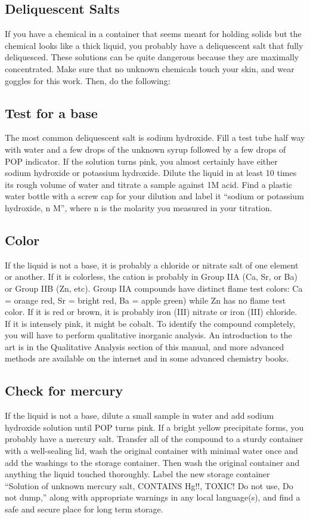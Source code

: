 \begin{itemize}
{\section{Deliquescent Salts}

If you have a chemical in a container that seems meant 
for holding solids but the chemical looks like a thick liquid, 
you probably have a deliquescent salt that fully deliquesced. 
These solutions can be quite dangerous 
because they are maximally concentrated. 
Make sure that no unknown chemicals touch your skin, 
and wear goggles for this work. 
Then, 
do the following:

\subsection{Test for a base}
The most common deliquescent salt is sodium hydroxide. 
Fill a test tube half way with water 
and a few drops of the unknown syrup 
followed by a few drops of POP indicator. 
If the solution turns pink, 
you almost certainly have either 
sodium hydroxide or potassium hydroxide. 
Dilute the liquid in at least 10 times its 
rough volume of water and titrate a sample against 1M acid. 
Find a plastic water bottle with a screw cap for your dilution and 
label it “sodium or potassium hydroxide, 
n M”, 
where n is the molarity you measured in your titration.

\subsection{Color}
If the liquid is not a base, 
it is probably a chloride or nitrate salt of one element or another. 
If it is colorless, 
the cation is probably in Group IIA (Ca, 
Sr, 
or Ba) or Group IIB (Zn, 
etc). 
Group IIA compounds have distinct flame test colors: Ca = orange red, 
Sr = bright red, 
Ba = apple green) while Zn has no flame test color. 
If it is red or brown, 
it is probably iron (III) nitrate or iron (III) chloride. 
If it is intensely pink, 
it might be cobalt. 
To identify the compound completely, 
you will have to perform qualitative inorganic analysis. 
An introduction to the art is 
in the Qualitative Analysis section of this manual, 
and more advanced methods are available on the internet 
and in some advanced chemistry books.

\subsection{Check for mercury}
If the liquid is not a base, 
dilute a small sample in water 
and add sodium hydroxide solution until POP turns pink. 
If a bright yellow precipitate forms, 
you probably have a mercury salt. 
Transfer all of the compound to a sturdy container 
with a well-sealing lid, 
wash the original container with minimal water once 
and add the washings to the storage container. 
Then wash the original container 
and anything the liquid touched thoroughly. 
Label the new storage container “Solution of unknown mercury salt, 
CONTAINS Hg!!, 
TOXIC! Do not use, 
Do not dump,” along with appropriate warnings in any local language(s), 
and find a safe and secure place for long term storage.

}
\end{itemize}
